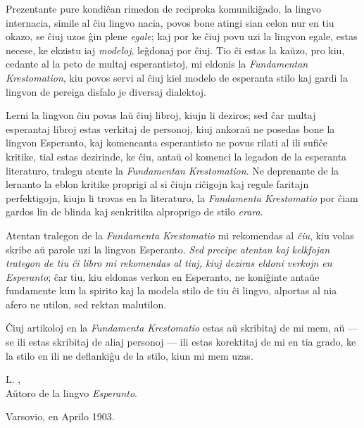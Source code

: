 Prezentante pure kondi\^can rimedon de reciproka komuniki\^gado, la
lingvo internacia, simile al \^ciu lingvo nacia, povos bone atingi
sian celon nur en tiu okazo, se \^ciuj uzos \^gin plene {\it egale};
kaj por ke \^ciuj povu uzi la lingvon egale, estas necese, ke
ekzistu iaj {\it modeloj}, le\^gdonaj por \^ciuj. Tio \^ci estas la
ka\u uzo, pro kiu, cedante al la peto de multaj esperantistoj, mi
eldonis la {\it Fundamentan Krestomation}, kiu povos servi al \^ciuj
kiel modelo de esperanta stilo kaj gardi la lingvon de pereiga
disfalo je diversaj dialektoj.

   Lerni la lingvon \^ciu povas la\u u \^ciuj libroj, kiujn li deziros; sed
\^car multaj esperantaj libroj estas verkitaj de personoj, kiuj
ankora\u u ne posedas bone la lingvon Esperanto, kaj komencanta
esperantisto ne povus rilati al ili sufi\^ce kritike, tial estas
dezirinde, ke \^ciu, anta\u u ol komenci la legadon de la esperanta
literaturo, tralegu atente la {\it Fundamentan Krestomation}. Ne
deprenante de la lernanto la eblon kritike proprigi al si \^ciujn
ri\^cigojn kaj regule faritajn perfektigojn, kiujn li trovas en la
literaturo, la {\it Fundamenta Krestomatio} por \^ciam gardos lin de
blinda kaj senkritika alproprigo de stilo {\it erara}.

   Atentan tralegon de la {\it Fundamenta Krestomatio} mi rekomendas al
{\it \^ciu}, kiu volas skribe a\u u parole uzi la lingvon Esperanto.
{\it Sed precipe atentan kaj kelkfojan trategon de tiu \^ci libro mi
rekomendas al tiuj, kiuj deziras eldoni verkojn en Esperanto}; \^car
tiu, kiu eldonas verkon en Esperanto, ne koni\^ginte anta\u ue
fundamente kun la spirito kaj la modela stilo de tiu \^ci lingvo,
alportas al nia afero ne utilon, sed rektan malutilon.

   \^Ciuj artikoloj en la {\it Fundamenta Krestomatio} estas a\u u skribitaj
de mi mem, a\u u --- se ili estas skribitaj de aliaj personoj ---
ili estas korektitaj de mi en tia grado, ke la stilo en ili ne
deflanki\^gu de la stilo, kiun mi mem uzas.

\begin{flushright}
\begin{minipage}{5cm}
\begin{center}
L. ,\\
\footnotesize A\u utoro de la lingvo {\it Esperanto}.
\end{center}
\end{minipage}
\end{flushright}
\begin{flushleft}
\small Varsovio, en Aprilo 1903.
\end{flushleft}
